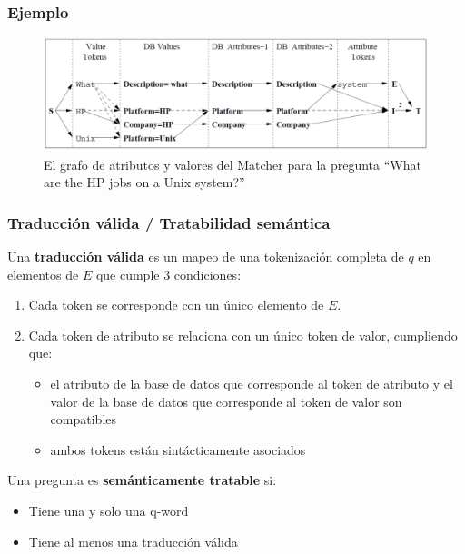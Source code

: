 \begin{frame}
  \frametitle{Ejemplo}

  \begin{figure}
    \centering
      \includegraphics[scale=0.3]{graficos/popescu-example-2}
    \caption{El grafo de atributos y valores del Matcher para la pregunta ``What are the HP jobs on a Unix system?''}
    \label{fig:popescu-example-2}
  \end{figure}

\end{frame}

\begin{frame}[<+->]
    \frametitle{Traducción válida / Tratabilidad semántica}    
     Una \textbf{traducción válida} es un mapeo de una tokenización completa de $q$ en elementos de $E$ que cumple 3 condiciones:
    \begin{enumerate}
      \item Cada token se corresponde con un único elemento de $E$.
      \item Cada token de atributo se relaciona con un único token de valor, cumpliendo que:
      \begin{itemize}
        \fontsize{9.5pt}{7.2}\selectfont
        \item el atributo de la base de datos que corresponde al token de atributo y el valor de la base de datos que corresponde al token de valor son compatibles
        \item ambos tokens están sintácticamente asociados \footnotemark 
       \end{itemize}
    \end{enumerate}

    \bigskip
    Una pregunta es \textbf{semánticamente tratable} si:
    \begin{itemize}
      \item Tiene una y solo una q-word 
      \item Tiene al menos una traducción válida
    \end{itemize}



\end{frame}

